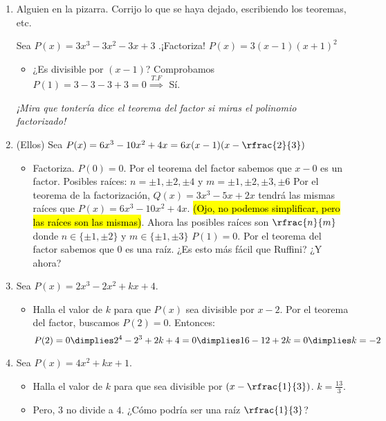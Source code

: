 \begin{enumerate}
\item Alguien en la pizarra. Corrijo lo que se haya dejado, escribiendo los teoremas, etc.

Sea $P(x) = 3x^3-3x^2-3x+3$ .¡Factoriza! $P(x) = 3(x-1)(x+1)^2$

\begin{itemize}
	\item ¿Es divisible por $(x-1)$? Comprobamos $P(1) = 3-3-3+3 = 0 \overset{T.F}{\implies}$ Sí.
\end{itemize}

\textit{¡Mira que tontería dice el teorema del factor si miras el polinomio factorizado!}

\item (Ellos) Sea $P(x) = 6x^3-10x^2+4x = 6x(x-1)(x-\rfrac{2}{3})$ 
\begin{itemize}
	\item Factoriza.
	\subitem $P(0) = 0$. Por el teorema del factor sabemos que $x-0$ es un factor.
	\subitem Posibles raíces: $n=\pm1,\pm2,\pm4$ y $m=\pm1,\pm2,\pm3,\pm6$	
	\subitem Por el teorema de la factorización, $Q(x) = 3x^3-5x+2x$ tendrá las mismas raíces que $P(x) = 6x^3-10x^2+4x$. \hl{(Ojo, no podemos simplificar, pero las raíces son las mismas)}. Ahora las posibles raíces son $\rfrac{n}{m}$ donde $n\in\{\pm1,\pm2\}$ y $m\in\{\pm1,\pm3\}$
	\subitem $P(1) = 0$. Por el teorema del factor sabemos que $0$ es una raíz. ¿Es esto más fácil que Ruffini? ¿Y ahora?
\end{itemize}

\item Sea $P(x) = 2x^3-2x^2+kx+4$.
\begin{itemize}
	\item Halla el valor de $k$ para que $P(x)$ sea divisible por $x-2$.
	\subitem Por el teorema del factor, buscamos $P(2) = 0$. Entonces:
	\[
		P(2) = 0 \dimplies 2^4-2^3+2k+4 = 0 \dimplies 16-12+2k = 0 \dimplies k = -2
	\]
\end{itemize}




\item Sea $P(x) = 4x^2+kx+1$.
\begin{itemize}
	\item Halla el valor de $k$ para que sea divisible por $\left(x-\rfrac{1}{3}\right)$. $k=\frac{13}{3}$.
	\item Pero, $3$ no divide a $4$. ¿Cómo podría ser una raíz $\rfrac{1}{3}$?
\end{itemize}



\end{enumerate}
